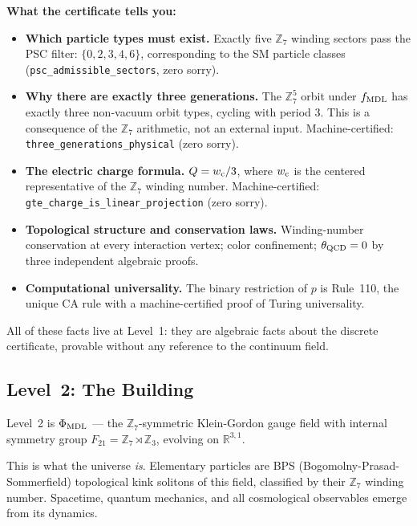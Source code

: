 \documentclass[11pt,a4paper]{article}
\newcommand{\lean}[1]{\texttt{#1}}
\newcommand{\PhiMDL}{\Phi_{\rm MDL}}
\newcommand{\ZS}{\mathbb{Z}_7}
\newcommand{\poly}{p}
\newcommand{\fMDL}{f_{\rm MDL}}
\begin{document}
\medskip
\textbf{What the certificate tells you:}
\begin{itemize}[itemsep=5pt]
  \item \textbf{Which particle types must exist.}
    Exactly five $\ZS$ winding sectors pass the PSC filter:
    $\{0,2,3,4,6\}$, corresponding to the SM particle classes
    (\lean{psc\_admissible\_sectors}, zero sorry).

  \item \textbf{Why there are exactly three generations.}
    The $\ZS^5$ orbit under $\fMDL$ has exactly three non-vacuum
    orbit types, cycling with period 3.
    This is a consequence of the $\ZS$ arithmetic, not an external input.
    Machine-certified: \lean{three\_generations\_physical} (zero sorry).

  \item \textbf{The electric charge formula.}
    $Q = w_{\rm c}/3$, where $w_{\rm c}$ is the centered representative of the
    $\ZS$ winding number.
    Machine-certified: \lean{gte\_charge\_is\_linear\_projection} (zero sorry).

  \item \textbf{Topological structure and conservation laws.}
    Winding-number conservation at every interaction vertex;
    color confinement; $\theta_{\rm QCD} = 0$ by three independent
    algebraic proofs.

  \item \textbf{Computational universality.}
    The binary restriction of $\poly$ is Rule~110, the unique CA rule with
    a machine-certified proof of Turing universality.
\end{itemize}

All of these facts live at Level~1: they are algebraic facts about the discrete
certificate, provable without any reference to the continuum field.

\subsection{Level~2: The Building}

Level~2 is $\PhiMDL$ --- the $\ZS$-symmetric Klein-Gordon gauge field with
internal symmetry group $F_{21} = \ZS\rtimes\mathbb{Z}_3$, evolving on
$\mathbb{R}^{3,1}$.

\medskip
This is what the universe \emph{is}.
Elementary particles are BPS (Bogomolny-Prasad-Sommerfield) topological
kink solitons of this field, classified by their $\ZS$ winding number.
Spacetime, quantum mechanics, and all cosmological observables emerge from
its dynamics.
\end{document}
